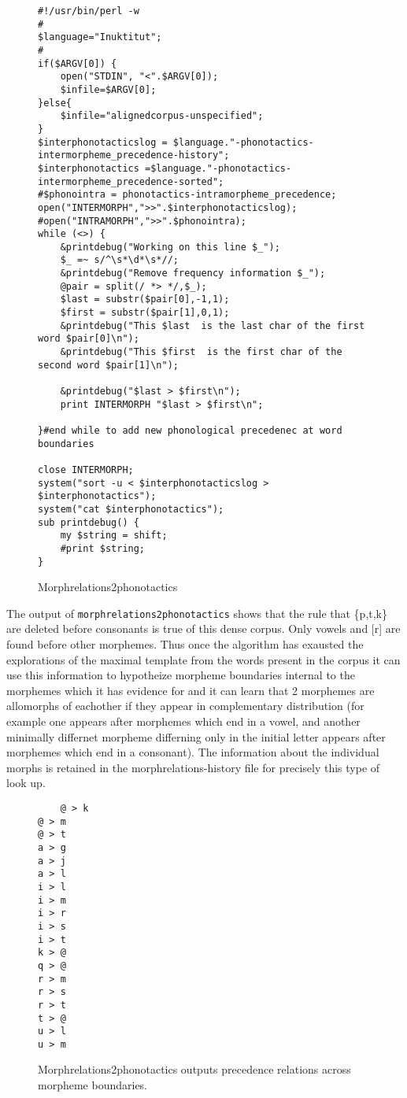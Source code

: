 \documentclass[runningheads,a4paper]{llncs}
\begin{document}
\begin{figure*}[p]
\begin{verbatim}
#!/usr/bin/perl -w
#
$language="Inuktitut";
#
if($ARGV[0]) {
	open("STDIN", "<".$ARGV[0]);
	$infile=$ARGV[0];
}else{
	$infile="alignedcorpus-unspecified";
}
$interphonotacticslog = $language."-phonotactics-intermorpheme_precedence-history";
$interphonotactics =$language."-phonotactics-intermorpheme_precedence-sorted";
#$phonointra = phonotactics-intramorpheme_precedence;
open("INTERMORPH",">>".$interphonotacticslog);
#open("INTRAMORPH",">>".$phonointra);
while (<>) {
	&printdebug("Working on this line $_");
	$_ =~ s/^\s*\d*\s*//;
	&printdebug("Remove frequency information $_");
	@pair = split(/ *> */,$_);
	$last = substr($pair[0],-1,1);
	$first = substr($pair[1],0,1);
	&printdebug("This $last  is the last char of the first word $pair[0]\n");
	&printdebug("This $first  is the first char of the  second word $pair[1]\n");
	
	&printdebug("$last > $first\n");
	print INTERMORPH "$last > $first\n";

}#end while to add new phonological precedenec at word boundaries

close INTERMORPH;
system("sort -u < $interphonotacticslog > $interphonotactics");
system("cat $interphonotactics");
sub printdebug() {
	my $string = shift;
	#print $string;
}
\end{verbatim}
	\caption{Morphrelations2phonotactics}
	\label{fig:morphrelations2phonotactics}
\end{figure*}

The output of {\tt morphrelations2phonotactics} shows that the rule that \{p,t,k\} are deleted before consonants is true of this dense corpus. Only vowels and [r] are found before other morphemes. Thus once the algorithm has exausted the explorations of the maximal template from the words present in the corpus it can use this information to hypotheize morpheme boundaries internal to the morphemes which it has evidence for and it can learn that 2 morphemes are allomorphs of eachother if they appear in complementary distribution (for example one appears after morphemes which end in a vowel, and another minimally differnet morpheme differning only in the initial letter appears after morphemes which end in a consonant). The information about the individual morphs is retained in the morphrelations-history file for precisely this type of look up.

\begin{figure}[htb]
	\begin{verbatim}
	@ > k
@ > m
@ > t
a > g
a > j
a > l
i > l
i > m
i > r
i > s
i > t
k > @
q > @
r > m
r > s
r > t
t > @
u > l
u > m

	\end{verbatim}
	\caption{Morphrelations2phonotactics outputs precedence relations across morpheme boundaries.}
	\label{fig:morphrelations2phonotacticsoutput}
\end{figure}
\end{document}

